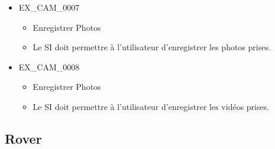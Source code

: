 \documentclass[12pt,a4paper]{scrartcl}
\begin{document}
\begin{itemize}
\item EX\_CAM\_0007
\begin{itemize}
\item Enregistrer Photos
\item Le SI doit permettre à l'utilisateur d'enregistrer les photos prises.
\end{itemize}

\item EX\_CAM\_0008
\begin{itemize}
\item Enregistrer Photos
\item Le SI doit permettre à l'utilisateur d'enregistrer les vidéos prises.
\end{itemize}

\end{itemize}

\subsection{Rover}
\end{document}
